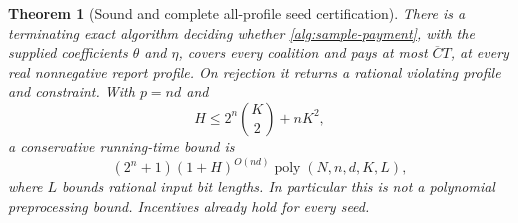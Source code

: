 \documentclass[11pt]{article}
\newtheorem{theorem}{Theorem}[section]
\theoremstyle{definition}\newtheorem{definition}[theorem]{Definition}
\theoremstyle{remark}\newtheorem{remark}[theorem]{Remark}
\begin{document}
\begin{theorem}[Sound and complete all-profile seed certification]
\label{alg:certification}
There is a terminating exact algorithm deciding whether
\eqref{alg:sample-payment}, with the supplied coefficients $\theta$ and $\eta$,
covers every coalition and pays at most
$\overline C T$, at every real nonnegative report profile.
On rejection it returns a rational violating profile and constraint.
With $p=nd$ and
\[
 H\le 2^n\binom K2+nK^2,
\]
a conservative running-time bound is
\begin{equation}\label{alg:cert-cost}
 (2^n+1)(1+H)^{O(nd)}\operatorname{poly}(N,n,d,K,L),
\end{equation}
where $L$ bounds rational input bit lengths.  In particular this is not a
polynomial preprocessing bound.  Incentives already hold for every seed.
\end{theorem}
\end{document}
